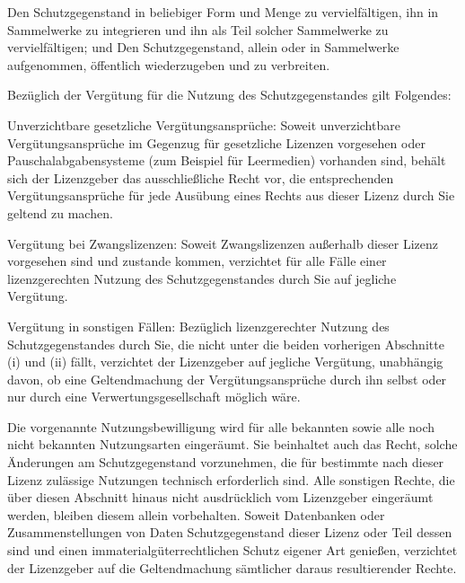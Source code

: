 \begin{description}
  \begin{compactitem}
    \item Den Schutzgegenstand in beliebiger Form und Menge zu
    vervielfältigen, ihn in Sammelwerke zu integrieren und
    ihn als Teil solcher Sammelwerke zu vervielfältigen; und
    Den Schutzgegenstand, allein oder in Sammelwerke
    aufgenommen, öffentlich wiederzugeben und zu verbreiten.
    \item Bezüglich der Vergütung für die Nutzung des
    Schutzgegenstandes gilt Folgendes:
    \begin{compactitem}
      \item Unverzichtbare gesetzliche Vergütungsansprüche:
      Soweit unverzichtbare Vergütungsansprüche im
      Gegenzug für gesetzliche Lizenzen vorgesehen oder
      Pauschalabgabensysteme (zum Beispiel für Leermedien)
      vorhanden sind, behält sich der Lizenzgeber das
      ausschließliche Recht vor, die entsprechenden
      Vergütungsansprüche für jede Ausübung eines Rechts
      aus dieser Lizenz durch Sie geltend zu machen.
      \item Vergütung bei Zwangslizenzen: Soweit Zwangslizenzen
      außerhalb dieser Lizenz vorgesehen sind und zustande
      kommen, verzichtet für alle Fälle einer
      lizenzgerechten Nutzung des Schutzgegenstandes durch
      Sie auf jegliche Vergütung.
      \item Vergütung in sonstigen Fällen: Bezüglich
      lizenzgerechter Nutzung des Schutzgegenstandes durch
      Sie, die nicht unter die beiden vorherigen
      Abschnitte (i) und (ii) fällt, verzichtet der
      Lizenzgeber auf jegliche Vergütung, unabhängig
      davon, ob eine Geltendmachung der
      Vergütungsansprüche durch ihn selbst oder nur durch
      eine Verwertungsgesellschaft möglich wäre.
    \end{compactitem}
  \end{compactitem}
  Die vorgenannte Nutzungsbewilligung wird für alle bekannten
  sowie alle noch nicht bekannten Nutzungsarten eingeräumt.
  Sie beinhaltet auch das Recht, solche Änderungen am
  Schutzgegenstand vorzunehmen, die für bestimmte nach dieser
  Lizenz zulässige Nutzungen technisch erforderlich sind. Alle
  sonstigen Rechte, die über diesen Abschnitt hinaus nicht
  ausdrücklich vom Lizenzgeber eingeräumt werden, bleiben
  diesem allein vorbehalten. Soweit Datenbanken oder
  Zusammenstellungen von Daten Schutzgegenstand dieser Lizenz
  oder Teil dessen sind und einen immaterialgüterrechtlichen
  Schutz eigener Art genießen, verzichtet der Lizenzgeber auf
  die Geltendmachung sämtlicher daraus resultierender Rechte.


\end{description}

